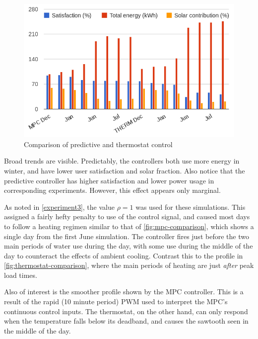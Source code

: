 \begin{figure}
   \centering
   \includegraphics[width=\textwidth]{images/comparison}
   \caption{Comparison of predictive and thermostat control}
   \label{fig:comparison}
\end{figure}

Broad trends are visible.
Predictably, the controllers both use more energy in winter, and have lower user satisfaction and solar fraction.
Also notice that the predictive controller has higher satisfaction and lower power usage in corresponding experiments.
However, this effect appears only marginal.

As noted in \autoref{experiment3}, the value $\rho=1$ was used for these simulations.
This assigned a fairly hefty penalty to use of the control signal, and caused most days to follow a heating regimen similar to that of \autoref{fig:mpc-comparison}, which shows a single day from the first June simulation.
The controller fires just before the two main periods of water use during the day, with some use during the middle of the day to counteract the effects of ambient cooling.
Contrast this to the profile in \autoref{fig:thermostat-comparison}, where the main periods of heating are just \emph{after} peak load times.

Also of interest is the smoother profile shown by the MPC controller.
This is a result of the rapid (10 minute period) PWM used to interpret the MPC's continuous control inputs.
The thermostat, on the other hand, can only respond when the temperature falls below its deadband, and causes the sawtooth seen in the middle of the day.

